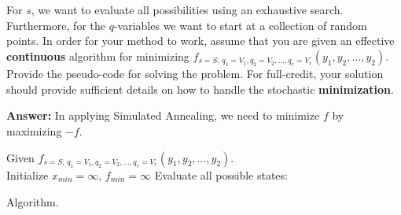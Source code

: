 \documentclass[12pt,legalpaper]{article}
\begin{document}
For $s$, we want to evaluate all possibilities using an exhaustive search.
Furthermore, for the $q$-variables we want to start at a collection of random points.
In order for your method to work, assume that you are given an effective {\bf continuous} 
  algorithm for minimizing $f_{s=S, \, q_1=V_1, q_2=V_2, \dots, q_r=V_r} (y_1, y_2, \dots, y_2)$.
Provide the pseudo-code for solving the problem. For full-credit, your solution should provide sufficient details
  on how to handle the stochastic {\bf minimization}.
  \newpage
  
{\bf Answer:} In applying Simulated Annealing, we need to minimize $f$ by maximizing $-f$.
 
 \IncMargin{1em}
\LinesNumbered
\begin{algorithm}
  Given $f_{s=S, \, q_1=V_1, q_2=V_2, \dots, q_r=V_r} (y_1, y_2, \dots, y_2)$. \\
  Initialize $x_{min}=\infty, \, f_{min}=\infty$\;
  Evaluate all possible states:\\
\caption{Algorithm.}
\end{algorithm}
\end{document}
